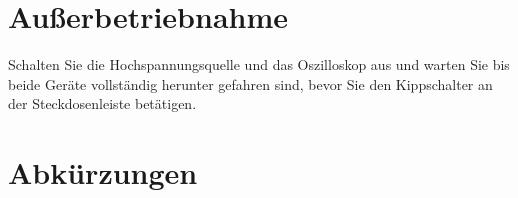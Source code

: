 \documentclass[a4paper,12pt,pointlessnumbers]{scrartcl}
\begin{document}
\section{Au{\ss}erbetriebnahme}
Schalten Sie die Hochspannungsquelle und das Oszilloskop aus und warten Sie bis beide Ger{\"a}te vollst{\"a}ndig herunter gefahren sind, bevor Sie den Kippschalter an der Steckdosenleiste bet{\"a}tigen.

\appendix
\section*{Abk\"{u}rzungen}
\begin{acronym}[XXXXX]
\end{acronym}
\end{document}
